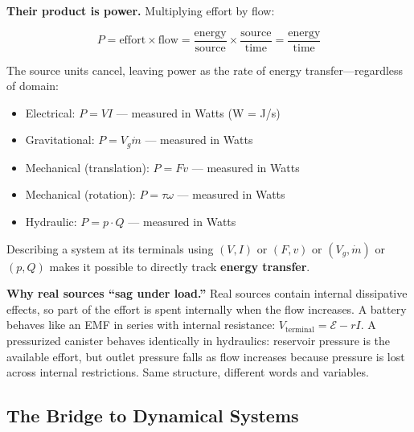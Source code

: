 \documentclass[
  letterpaper,
  DIV=11,
  numbers=noendperiod]{scrartcl}
\providecommand{\tightlist}{%
  \setlength{\itemsep}{0pt}\setlength{\parskip}{0pt}}
\begin{document}
\textbf{Their product is power.} Multiplying effort by flow:

\[P = \text{effort} \times \text{flow} = \frac{\text{energy}}{\text{source}} \times \frac{\text{source}}{\text{time}} = \frac{\text{energy}}{\text{time}}\]

The source units cancel, leaving power as the rate of energy
transfer---regardless of domain:

\begin{itemize}
\tightlist
\item
  Electrical: \(P = VI\) --- measured in Watts (W = J/s)
\item
  Gravitational: \(P = V_g \dot{m}\) --- measured in Watts
\item
  Mechanical (translation): \(P = Fv\) --- measured in Watts
\item
  Mechanical (rotation): \(P = \tau\omega\) --- measured in Watts
\item
  Hydraulic: \(P = p \cdot Q\) --- measured in Watts
\end{itemize}

Describing a system at its terminals using \((V, I)\) or \((F, v)\) or
\((V_g, \dot{m})\) or \((p, Q)\) makes it possible to directly track
\textbf{energy transfer}.

\begin{tcolorbox}[enhanced jigsaw, title=\textcolor{quarto-callout-tip-color}{\faLightbulb}\hspace{0.5em}{Tip}, breakable, left=2mm, opacitybacktitle=0.6, rightrule=.15mm, opacityback=0, toptitle=1mm, bottomrule=.15mm, arc=.35mm, leftrule=.75mm, colbacktitle=quarto-callout-tip-color!10!white, toprule=.15mm, colframe=quarto-callout-tip-color-frame, bottomtitle=1mm, titlerule=0mm, colback=white, coltitle=black]

\textbf{Why real sources ``sag under load.''} Real sources contain
internal dissipative effects, so part of the effort is spent internally
when the flow increases. A battery behaves like an EMF in series with
internal resistance: \(V_{\text{terminal}} = \mathcal{E} - rI\). A
pressurized canister behaves identically in hydraulics: reservoir
pressure is the available effort, but outlet pressure falls as flow
increases because pressure is lost across internal restrictions. Same
structure, different words and variables.

\end{tcolorbox}

\subsection{The Bridge to Dynamical
Systems}\label{the-bridge-to-dynamical-systems}
\end{document}
